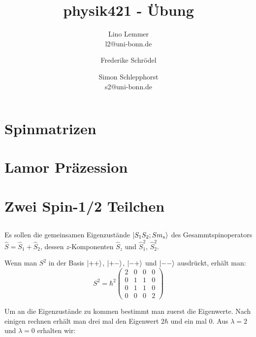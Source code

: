 

\setcounter{thezettel}{10}
\renewcommand\thesection{\arabic{thezettel}.\arabic{section}}



\title{physik421 - Übung }
\author{Lino Lemmer \\ \small{l2@uni-bonn.de} \and Frederike Schrödel \and Simon Schlepphorst\\ \small{s2@uni-bonn.de}}


\maketitle

\section{Spinmatrizen}

\section{Lamor Präzession}

\section{Zwei Spin-1/2 Teilchen}
\subsection{}
Es sollen die gemeinsamen Eigenzustände $\left|S_1S_2;Sm_s\right\rangle$ des Gesammtspinoperators $\hat S=\hat S_1+\hat S_2$, dessen $z$-Komponenten $\hat S_z$ und $\hat S_1^2$, $\hat S_2^2$.

Wenn man $S^2$ in der Basis $\left|++\right\rangle$, $\left|+-\right\rangle$, $\left|-+\right\rangle$ und $\left|--\right\rangle$ ausdrückt, erhält man:
\[
    S^2 = \hbar^2 \begin{pmatrix}
        2 &0 &0 &0 \\
        0 &1 &1 &0 \\
        0 &1 &1 &0 \\
        0 &0 &0 &2
    \end{pmatrix}
\]

Um an die Eigenzustände zu kommen bestimmt man zuerst die Eigenwerte. Nach einigen rechnen erhält man drei mal den Eigenwert $2\hbar$ und ein mal 0. 
Aus $\lambda = 2$ und $\lambda = 0$ erhalten wir:

